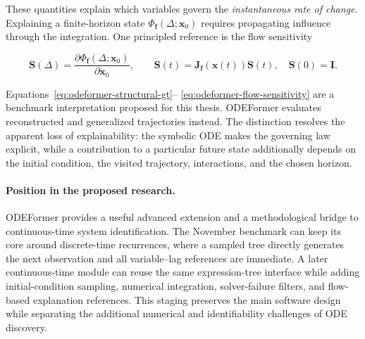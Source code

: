 These quantities explain which variables govern the \emph{instantaneous rate
of change}. Explaining a finite-horizon state
$\Phi_{\mathbf f}(\Delta;\mathbf x_0)$ requires propagating influence through
the integration. One principled reference is the flow sensitivity

\begin{equation}
\mathbf S(\Delta)=
\frac{\partial\Phi_{\mathbf f}(\Delta;\mathbf x_0)}{\partial\mathbf x_0},
\qquad
\dot{\mathbf S}(t)=
\mathbf J_{\mathbf f}(\mathbf x(t))\mathbf S(t),
\quad \mathbf S(0)=\mathbf I.
\label{eq:odeformer-flow-sensitivity}
\end{equation}

Equations~\eqref{eq:odeformer-structural-gt}--
\eqref{eq:odeformer-flow-sensitivity} are a benchmark interpretation proposed
for this thesis. ODEFormer evaluates reconstructed and generalized trajectories
instead. The distinction resolves the apparent loss of explainability: the
symbolic ODE makes the governing law explicit, while a contribution to a
particular future state additionally depends on the initial condition, the
visited trajectory, interactions, and the chosen horizon.

\paragraph{Position in the proposed research.}
ODEFormer provides a useful advanced extension and a methodological bridge to
continuous-time system identification. The November benchmark can keep its
core around discrete-time recurrences, where a sampled tree directly generates
the next observation and all variable--lag references are immediate. A later
continuous-time module can reuse the same expression-tree interface while
adding initial-condition sampling, numerical integration, solver-failure
filters, and flow-based explanation references. This staging preserves the
main software design while separating the additional numerical and
identifiability challenges of ODE discovery.

